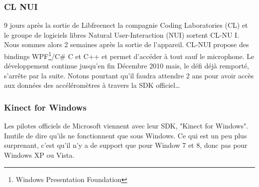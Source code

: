 \subsubsection{CL NUI}
9 jours après la sortie de Libfreenect la compagnie Coding Laboratories 
(CL) et le groupe de logiciels libres
Natural User-Interaction (NUI) sortent CL-NU
I\cite{clnui}. Nous sommes alors 2 semaines 
après la sortie de l'appareil. CL-NUI propose des bindings 
WPF\footnote{Windows Presentation Foundation}/C\# C et C++ et permet d'accéder 
à tout sauf le microphone. Le développement continue jusqu'en fin Décembre 2010 
mais,
le défi déjà remporté, s'arrête par la suite. Notons pourtant qu'il faudra 
attendre 2 ans pour avoir accès aux données des accéléromètres à travers la 
SDK officiel\ldots
\subsubsection{Kinect for Windows}  
Les pilotes officiels de Microsoft viennent avec leur SDK, "Kinect for 
Windows". Inutile de dire
qu'ils ne fonctionnent que sous Windows. Ce qui est un peu plus surprenant, 
c'est qu'il n'y a de support que pour Window 7 et 8, donc pas pour Windows XP 
ou Vista.
